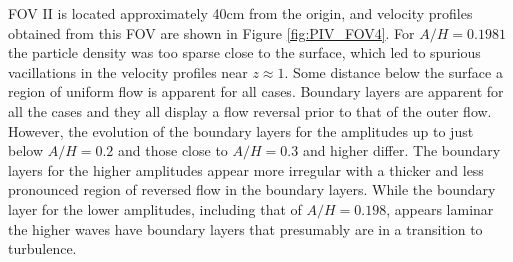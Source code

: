 \documentclass[review]{elsarticle}
\begin{document}
FOV II is located approximately 40cm from the origin, and velocity 
profiles obtained from this FOV are shown in Figure \ref{fig:PIV_FOV4}.
For $A/H=0.1981$ the particle density was too sparse close to the surface, which led to spurious vacillations in the velocity profiles near  $z\approx1$. Some distance below the surface a region of uniform flow is apparent for all cases. 
Boundary layers are apparent for all the cases and they all
display a flow reversal prior to that of the outer flow.
However, the evolution of the boundary layers for the amplitudes up to just below
$A/H=0.2$ and those close to $A/H=0.3$ and higher differ.
The boundary layers for the higher amplitudes appear more irregular
with a thicker and less pronounced region of reversed flow in the 
boundary layers.  
While the boundary layer for the lower amplitudes, including that of $A/H=0.198$, appears laminar the higher waves have boundary layers that 
presumably are in a transition to turbulence.   
\end{document}
